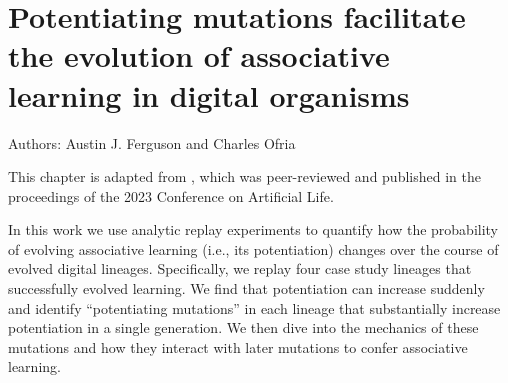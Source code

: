 \chapter{Potentiating mutations facilitate the evolution of associative learning in digital organisms}
\label{chap:learning_case_studies}

\noindent
Authors: Austin J. Ferguson and Charles Ofria 

\noindent This chapter is adapted from \citep{fergusonPotentiatingMutationsFacilitate2023}, which was peer-reviewed and published in the proceedings of the 2023 Conference on Artificial Life. 

In this work we use analytic replay experiments to quantify how the probability of evolving associative learning (i.e., its potentiation) changes over the course of evolved digital lineages. 
Specifically, we replay four case study lineages that successfully evolved learning. 
We find that potentiation can increase suddenly and identify ``potentiating mutations'' in each lineage that substantially increase potentiation in a single generation. 
We then dive into the mechanics of these mutations and how they interact with later mutations to confer associative learning. 



%
%



